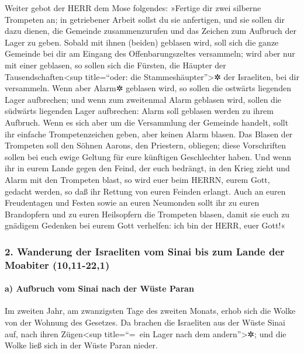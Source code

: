 Weiter gebot der HERR dem Mose folgendes:
»Fertige dir zwei silberne Trompeten an; in getriebener
Arbeit sollst du sie anfertigen, und sie sollen dir dazu dienen, die
Gemeinde zusammenzurufen und das Zeichen zum Aufbruch der Lager zu
geben. Sobald mit ihnen (beiden) geblasen wird, soll sich
die ganze Gemeinde bei dir am Eingang des Offenbarungszeltes versammeln;
wird aber nur mit einer geblasen, so sollen sich die
Fürsten, die Häupter der Tausendschaften\textless sup title=``oder: die
Stammeshäupter''\textgreater✲ der Israeliten, bei dir versammeln.
Wenn aber Alarm✲ geblasen wird, so sollen die ostwärts
liegenden Lager aufbrechen; und wenn zum zweitenmal Alarm
geblasen wird, sollen die südwärts liegenden Lager aufbrechen: Alarm
soll geblasen werden zu ihrem Aufbruch. Wenn es sich aber
um die Versammlung der Gemeinde handelt, sollt ihr einfache
Trompetenzeichen geben, aber keinen Alarm blasen. Das
Blasen der Trompeten soll den Söhnen Aarons, den Priestern, obliegen;
diese Vorschriften sollen bei euch ewige Geltung für eure künftigen
Geschlechter haben. Und wenn ihr in eurem Lande gegen den
Feind, der euch bedrängt, in den Krieg zieht und Alarm mit den Trompeten
blast, so wird euer beim HERRN, eurem Gott, gedacht werden, so daß ihr
Rettung von euren Feinden erlangt. Auch an euren
Freudentagen und Festen sowie an euren Neumonden sollt ihr zu euren
Brandopfern und zu euren Heilsopfern die Trompeten blasen, damit sie
euch zu gnädigem Gedenken bei eurem Gott verhelfen: ich bin der HERR,
euer Gott!«

\hypertarget{wanderung-der-israeliten-vom-sinai-bis-zum-lande-der-moabiter-1011-221}{%
\subsubsection{2. Wanderung der Israeliten vom Sinai bis zum Lande der
Moabiter
(10,11-22,1)}\label{wanderung-der-israeliten-vom-sinai-bis-zum-lande-der-moabiter-1011-221}}

\hypertarget{a-aufbruch-vom-sinai-nach-der-wuxfcste-paran}{%
\paragraph{a) Aufbruch vom Sinai nach der Wüste
Paran}\label{a-aufbruch-vom-sinai-nach-der-wuxfcste-paran}}

Im zweiten Jahr, am zwanzigsten Tage des zweiten Monats,
erhob sich die Wolke von der Wohnung des Gesetzes. Da
brachen die Israeliten aus der Wüste Sinai auf, nach ihren
Zügen\textless sup title=``=~ein Lager nach dem andern''\textgreater✲;
und die Wolke ließ sich in der Wüste Paran nieder.

